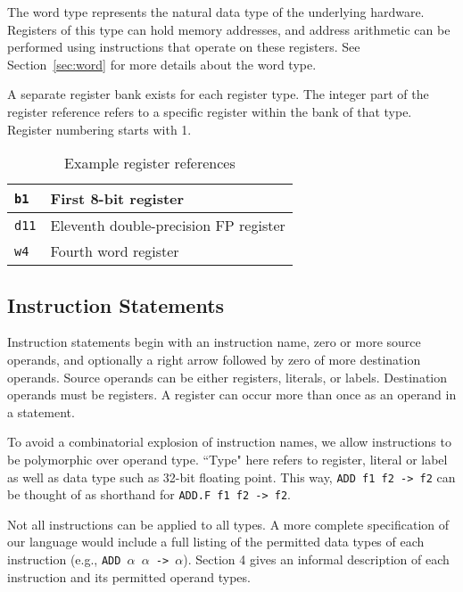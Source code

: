 The word type represents the natural data type of the underlying hardware.
Registers of this type can hold memory addresses, and address arithmetic
can be performed using instructions that operate on these registers.
See Section~\ref{sec:word} for more details about the word type.

A separate register bank exists for each register type. The integer
part of the register reference refers to a specific register
within the bank of that type. Register numbering starts with 1.

\begin{table}[h!]
  \begin{center}
    \begin{tabular}{|l|l|}
      \hline
      \texttt{b1}  & First 8-bit register                  \\ \hline
      \texttt{d11} & Eleventh double-precision FP register \\ \hline
      \texttt{w4}  & Fourth word register                  \\ \hline
    \end{tabular}
  \end{center}
  \caption{Example register references}
\end{table}

\subsection{Instruction Statements}

Instruction statements begin with an instruction name, zero or
more source operands, and optionally a right arrow followed by
zero of more destination operands. Source operands can be either registers,
literals, or labels. Destination operands must be registers.
A register can occur more than once as an operand in a statement.

To avoid a combinatorial explosion of instruction names,
we allow instructions to be polymorphic over operand type.
``Type" here refers to register, literal or label as well
as data type such as 32-bit floating point.
This way, \texttt{ADD f1 f2 -> f2} can be thought of as shorthand
for \texttt{ADD.F f1 f2 -> f2}.

Not all instructions can be applied to all types.
A more complete specification of our language would include
a full listing of the permitted data types of each instruction
(e.g., \texttt{ADD $\alpha$ $\alpha$ -> $\alpha$}). Section 4 gives an informal description of each instruction
and its permitted operand types.

